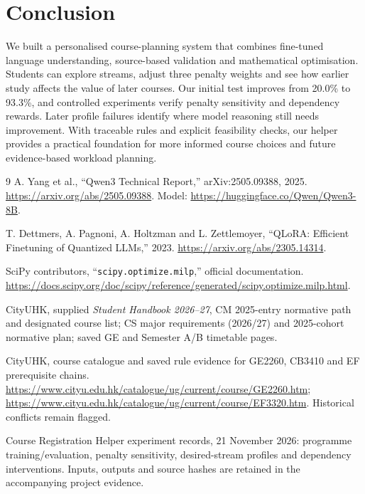 \documentclass{article}
\begin{document}
\section{Conclusion}
We built a personalised course-planning system that combines fine-tuned language understanding, source-based validation and mathematical optimisation. Students can explore streams, adjust three penalty weights and see how earlier study affects the value of later courses. Our initial test improves from 20.0\% to 93.3\%, and controlled experiments verify penalty sensitivity and dependency rewards. Later profile failures identify where model reasoning still needs improvement. With traceable rules and explicit feasibility checks, our helper provides a practical foundation for more informed course choices and future evidence-based workload planning.

\begin{thebibliography}{9}
\small
{}
A. Yang et al., ``Qwen3 Technical Report,'' arXiv:2505.09388, 2025.
\url{https://arxiv.org/abs/2505.09388}. Model: \url{https://huggingface.co/Qwen/Qwen3-8B}.

T. Dettmers, A. Pagnoni, A. Holtzman and L. Zettlemoyer, ``QLoRA: Efficient Finetuning of Quantized LLMs,'' 2023. \url{https://arxiv.org/abs/2305.14314}.

SciPy contributors, ``\texttt{scipy.optimize.milp},'' official documentation.
\url{https://docs.scipy.org/doc/scipy/reference/generated/scipy.optimize.milp.html}.

CityUHK, supplied \emph{Student Handbook 2026--27}, CM 2025-entry normative path and designated course list; CS major requirements (2026/27) and 2025-cohort normative plan; saved GE and Semester A/B timetable pages.

CityUHK, course catalogue and saved rule evidence for GE2260, CB3410 and EF prerequisite chains. \url{https://www.cityu.edu.hk/catalogue/ug/current/course/GE2260.htm}; \url{https://www.cityu.edu.hk/catalogue/ug/current/course/EF3320.htm}. Historical conflicts remain flagged.

Course Registration Helper experiment records, 21 November 2026: programme training/evaluation, penalty sensitivity, desired-stream profiles and dependency interventions. Inputs, outputs and source hashes are retained in the accompanying project evidence.
\end{thebibliography}
\end{document}
